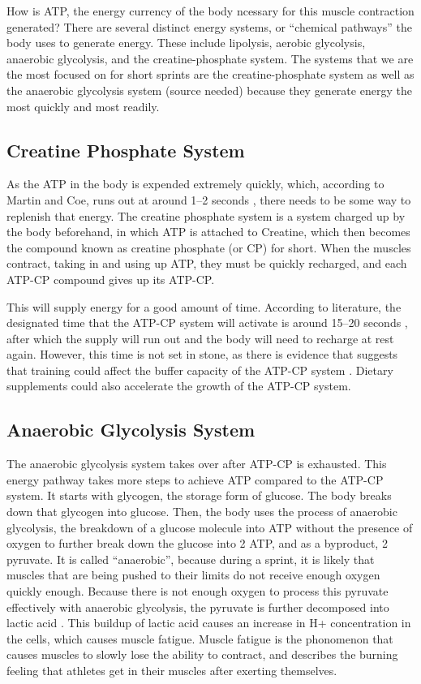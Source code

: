 \documentclass[index]{subfiles}
\begin{document}
How is ATP, the energy currency of the body ncessary for this muscle contraction generated? There are several distinct energy systems, or ``chemical pathways'' the body uses to generate energy. These include lipolysis, aerobic glycolysis, anaerobic glycolysis, and the creatine-phosphate system. The systems that we are the most focused on for short sprints are the creatine-phosphate system as well as the anaerobic glycolysis system (source needed) because they generate energy the most quickly and most readily.

\subsection{Creatine Phosphate System}

As the ATP in the body is expended extremely quickly, which, according to Martin and Coe, runs out at around 1--2 seconds \parencite[pg. 59]{martin1997better}, there needs to be some way to replenish that energy. The creatine phosphate system is a system charged up by the body beforehand, in which ATP is attached to Creatine, which then becomes the compound known as creatine phosphate (or CP) for short. When the muscles contract, taking in and using up ATP, they must be quickly recharged, and each ATP-CP compound gives up its ATP-CP\@.

This will supply energy for a good amount of time. According to literature, the designated time that the ATP-CP system will activate is around 15--20 seconds \parencite[pg. 59]{martin1997better}, after which the supply will run out and the body will need to recharge at rest again. However, this time is not set in stone, as there is evidence that suggests that training could affect the buffer capacity of the ATP-CP system \parencite{sahlinMuscleEnergeticsExplosive2014}. Dietary supplements could also accelerate the growth of the ATP-CP system.

\subsection{Anaerobic Glycolysis System}

The anaerobic glycolysis system takes over after ATP-CP is exhausted. This energy pathway takes more steps to achieve ATP compared to the ATP-CP system. It starts with glycogen, the storage form of glucose. The body breaks down that glycogen into glucose. Then, the body uses the process of anaerobic glycolysis, the breakdown of a glucose molecule into ATP without the presence of oxygen to further break down the glucose into 2 ATP, and as a byproduct, 2 pyruvate. It is called ``anaerobic'', because during a sprint, it is likely that muscles that are being pushed to their limits do not receive enough oxygen quickly enough. Because there is not enough oxygen to process this pyruvate effectively with anaerobic glycolysis, the pyruvate is further decomposed into lactic acid \parencite[24.4]{openstax2013muscle}. This buildup of lactic acid causes an increase in H+ concentration in the cells, which causes muscle fatigue. Muscle fatigue is the phonomenon that causes muscles to slowly lose the ability to contract, and describes the burning feeling that athletes get in their muscles after exerting themselves.
\end{document}
